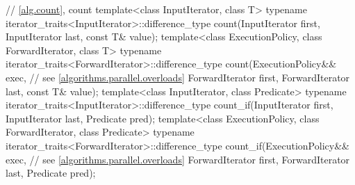 \begin{codeblock}
{  // \ref{alg.count}, count
  template<class InputIterator, class T>
    typename iterator_traits<InputIterator>::difference_type
      count(InputIterator first, InputIterator last, const T& value);
  template<class ExecutionPolicy, class ForwardIterator, class T>
    typename iterator_traits<ForwardIterator>::difference_type
      count(ExecutionPolicy&& exec, // see \ref{algorithms.parallel.overloads}
            ForwardIterator first, ForwardIterator last, const T& value);
  template<class InputIterator, class Predicate>
    typename iterator_traits<InputIterator>::difference_type
      count_if(InputIterator first, InputIterator last, Predicate pred);
  template<class ExecutionPolicy, class ForwardIterator, class Predicate>
    typename iterator_traits<ForwardIterator>::difference_type
      count_if(ExecutionPolicy&& exec, // see \ref{algorithms.parallel.overloads}
            ForwardIterator first, ForwardIterator last, Predicate pred);

}
\end{codeblock}
